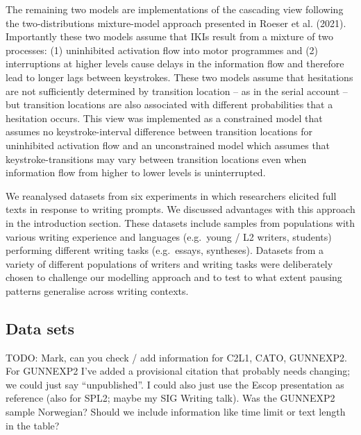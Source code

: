 \documentclass[
  man,floatsintext]{apa7}
\begin{document}
The remaining two models are implementations of the cascading view following the two-distributions mixture-model approach presented in Roeser et al. (2021). Importantly these two models assume that IKIs result from a mixture of two processes: (1) uninhibited activation flow into motor programmes and (2) interruptions at higher levels cause delays in the information flow and therefore lead to longer lags between keystrokes. These two models assume that hesitations are not sufficiently determined by transition location -- as in the serial account -- but transition locations are also associated with different probabilities that a hesitation occurs. This view was implemented as a constrained model that assumes no keystroke-interval difference between transition locations for uninhibited activation flow and an unconstrained model which assumes that keystroke-transitions may vary between transition locations even when information flow from higher to lower levels is uninterrupted.

We reanalysed datasets from six experiments in which researchers elicited full texts in response to writing prompts. We discussed advantages with this approach in the introduction section. These datasets include samples from populations with various writing experience and languages (e.g.~young / L2 writers, students) performing different writing tasks (e.g.~essays, syntheses). Datasets from a variety of different populations of writers and writing tasks were deliberately chosen to challenge our modelling approach and to test to what extent pausing patterns generalise across writing contexts.

\hypertarget{data-sets}{%
\subsection{Data sets}\label{data-sets}}

TODO: Mark, can you check / add information for C2L1, CATO, GUNNEXP2. For GUNNEXP2 I've added a provisional citation that probably needs changing; we could just say \enquote{unpublished}. I could also just use the Escop presentation as reference (also for SPL2; maybe my SIG Writing talk). Was the GUNNEXP2 sample Norwegian? Should we include information like time limit or text length in the table?
\end{document}
